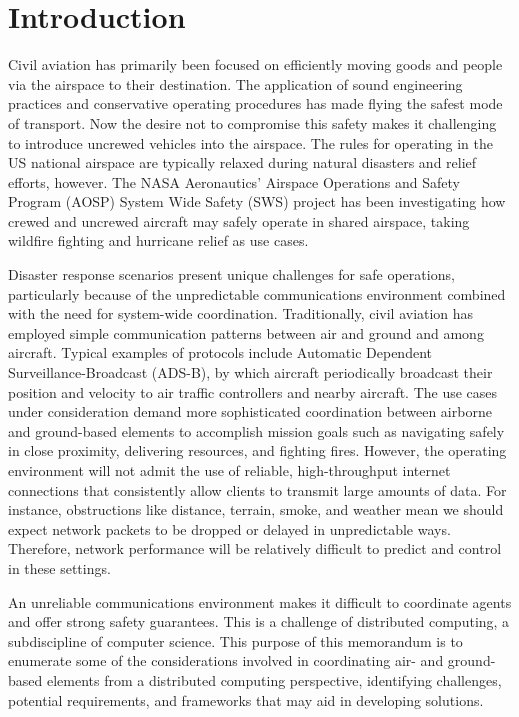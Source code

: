 \section{Introduction}
Civil aviation has primarily been focused on efficiently moving goods
and people via the airspace to their destination. The application of
sound engineering practices and conservative operating procedures has
made flying the safest mode of transport. Now the desire not to
compromise this safety makes it challenging to introduce uncrewed
vehicles into the airspace. The rules for operating in the US national
airspace are typically relaxed during natural disasters and relief
efforts, however. The NASA Aeronautics' Airspace Operations and Safety
Program (AOSP) System Wide Safety (SWS) project has been investigating
how crewed and uncrewed aircraft may safely operate in shared
airspace, taking wildfire fighting and hurricane relief as use cases.

Disaster response scenarios present unique challenges for safe
operations, particularly because of the unpredictable communications
environment combined with the need for system-wide
coordination. Traditionally, civil aviation has employed simple
communication patterns between air and ground and among
aircraft. Typical examples of protocols include Automatic Dependent
Surveillance-Broadcast (ADS-B), by which aircraft periodically
broadcast their position and velocity to air traffic controllers and
nearby aircraft. The use cases under consideration demand more
sophisticated coordination between airborne and ground-based elements
to accomplish mission goals such as navigating safely in close
proximity, delivering resources, and fighting fires. However, the
operating environment will not admit the use of reliable,
high-throughput internet connections that consistently allow clients to
transmit large amounts of data. For instance, obstructions
like distance, terrain, smoke, and weather mean we should expect
network packets to be dropped or delayed in unpredictable
ways. Therefore, network performance will be relatively difficult to
predict and control in these settings.

An unreliable communications environment makes it difficult to
coordinate agents and offer strong safety guarantees. This is a
challenge of distributed computing, a subdiscipline of computer
science. This purpose of this memorandum is to enumerate some of the
considerations involved in coordinating air- and ground-based elements
from a distributed computing perspective, identifying challenges,
potential requirements, and frameworks that may aid in developing
solutions.

